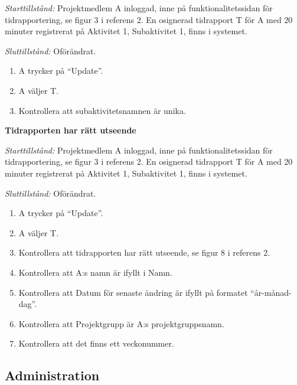 \documentclass[a4paper]{article}
\begin{document}
\begin{FT}
\emph{Starttillstånd:} Projektmedlem A inloggad, inne på funktionalitetssidan för tidrapportering, se figur 3 i referens 2. En osignerad tidrapport T för A med 20 minuter registrerat på Aktivitet 1, Subaktivitet 1, finns i systemet.

\emph{Sluttillstånd:} Oförändrat.

\begin{enumerate}
\item A trycker på ``Update''.
\item A väljer T.
\item Kontrollera att subaktivitetsnamnen är unika.
\end{enumerate}

\item\textbf{Tidrapporten har rätt utseende}

\emph{Starttillstånd:} Projektmedlem A inloggad, inne på funktionalitetssidan för tidrapportering, se figur 3 i referens 2. En osignerad tidrapport T för A med 20 minuter registrerat på Aktivitet 1, Subaktivitet 1, finns i systemet.

\emph{Sluttillstånd:} Oförändrat.

\begin{enumerate}
\item A trycker på ``Update''.
\item A väljer T.
\item Kontrollera att tidrapporten har rätt utseende, se figur 8 i referens 2.
\item Kontrollera att A:s namn är ifyllt i Namn.
\item Kontrollera att Datum för senaste ändring är ifyllt på formatet ``år-månad-dag''.
\item Kontrollera att Projektgrupp är A:s projektgruppsnamn.
\item Kontrollera att det finns ett veckonummer.
\end{enumerate}

\end{FT}






\subsection{Administration}
\end{document}
